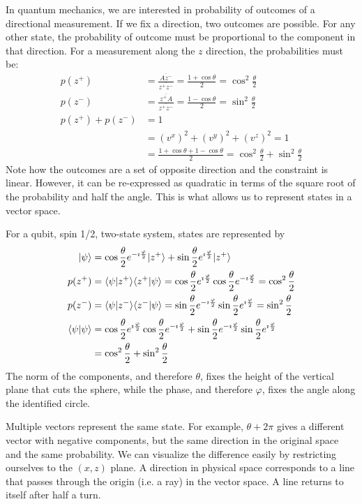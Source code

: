 \documentclass{techbrief}
\begin{document}
In quantum mechanics, we are interested in probability of outcomes of a directional measurement. If we fix a direction, two outcomes are possible. For any other state, the probability of outcome must be proportional to the component in that direction. For a measurement along the $z$ direction, the probabilities must be:
\begin{equation}
	\begin{aligned}
		p(z^+) &= \frac{\overline{A z^-}}{\overline{z^+ z^-}} = \frac{1+\cos \theta}{2} = \cos^2 \frac{\theta}{2} \\
		p(z^-) &= \frac{\overline{z^+ A}}{\overline{z^+ z^-}} = \frac{1-\cos \theta}{2} = \sin^2 \frac{\theta}{2} \\
		p(z^+) + p(z^-)&= 1 \\
		&= (v^x)^2 + (v^y)^2 + (v^z)^2 = 1 \\
		&= \frac{1+\cos \theta + 1-\cos \theta}{2} = \cos^2 \frac{\theta}{2} + \sin^2 \frac{\theta}{2}
	\end{aligned}
\end{equation}
Note how the outcomes are a set of opposite direction and the constraint is linear. However, it can be re-expressed as quadratic in terms of the square root of the probability and half the angle. This is what allows us to represent states in a vector space.

For a qubit, spin 1/2, two-state system, states are represented by
\begin{equation}
	\begin{aligned}
		| \psi \rangle &= \cos \frac{\theta}{2} e^{-\imath \frac{\varphi}{2}} | z^+ \rangle + \sin \frac{\theta}{2} e^{\imath \frac{\varphi}{2}} | z^+ \rangle \\
		p(z^+) &= \langle\psi | z^+ \rangle \langle z^+ | \psi \rangle = \cos \frac{\theta}{2} e^{\imath \frac{\varphi}{2}} \cos \frac{\theta}{2} e^{-\imath \frac{\varphi}{2}} = \cos^2 \frac{\theta}{2} \\
	p(z^-) &= \langle\psi | z^- \rangle \langle z^- | \psi \rangle = \sin \frac{\theta}{2} e^{-\imath \frac{\varphi}{2}} \sin \frac{\theta}{2} e^{\imath \frac{\varphi}{2}} = \sin^2 \frac{\theta}{2} \\
		\langle \psi | \psi \rangle &= \cos \frac{\theta}{2} e^{\imath \frac{\varphi}{2}} \cos \frac{\theta}{2} e^{-\imath \frac{\varphi}{2}} + \sin \frac{\theta}{2} e^{-\imath \frac{\varphi}{2}} \sin \frac{\theta}{2} e^{\imath \frac{\varphi}{2}} \\
		&= \cos^2 \frac{\theta}{2} + \sin^2 \frac{\theta}{2} \\
	\end{aligned}
\end{equation}
The norm of the components, and therefore $\theta$, fixes the height of the vertical plane that cuts the sphere, while the phase, and therefore $\varphi$, fixes the angle along the identified circle.

Multiple vectors represent the same state. For example, $\theta + 2\pi$ gives a different vector with negative components, but the same direction in the original space and the same probability. We can visualize the difference easily by restricting ourselves to the $(x,z)$ plane. A direction in physical space corresponds to a line that passes through the origin (i.e. a ray) in the vector space. A line returns to itself after half a turn.
\end{document}
